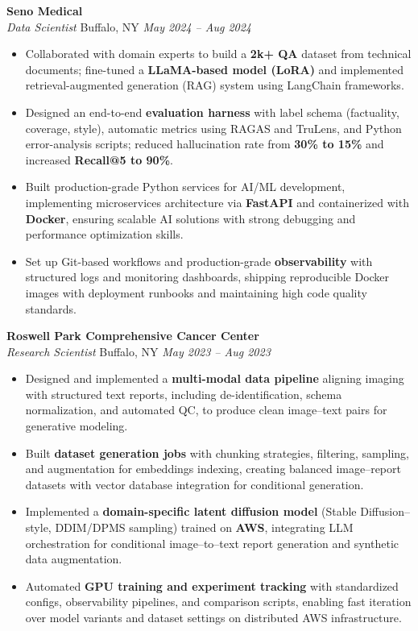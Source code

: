 \vspace*{-1pt}
\item \textbf{Seno Medical}\\
\textit{Data Scientist} \hfill Buffalo, NY \quad \textit{May 2024 -- Aug 2024}
\vspace*{-3pt}
\begin{itemize}[leftmargin=0.2in, topsep=1pt]
  \item Collaborated with domain experts to build a \textbf{2k+ QA} dataset from technical documents; fine-tuned a \textbf{LLaMA-based model (LoRA)} and implemented retrieval-augmented generation (RAG) system using LangChain frameworks.
  \item Designed an end-to-end \textbf{evaluation harness} with label schema (factuality, coverage, style), automatic metrics using RAGAS and TruLens, and Python error-analysis scripts; reduced hallucination rate from \textbf{30\% to 15\%} and increased \textbf{Recall@5 to 90\%}.
  \item Built production-grade Python services for AI/ML development, implementing microservices architecture via \textbf{FastAPI} and containerized with \textbf{Docker}, ensuring scalable AI solutions with strong debugging and performance optimization skills.
  \item Set up Git-based workflows and production-grade \textbf{observability} with structured logs and monitoring dashboards, shipping reproducible Docker images with deployment runbooks and maintaining high code quality standards.
\end{itemize}

\vspace*{-1pt}
\item \textbf{Roswell Park Comprehensive Cancer Center}\\
\textit{Research Scientist} \hfill Buffalo, NY \quad \textit{May 2023 -- Aug 2023}
\vspace*{-3pt}
\begin{itemize}[leftmargin=0.2in, topsep=1pt]
  \item Designed and implemented a \textbf{multi-modal data pipeline} aligning imaging with structured text reports, including de-identification, schema normalization, and automated QC, to produce clean image–text pairs for generative modeling.
  \item Built \textbf{dataset generation jobs} with chunking strategies, filtering, sampling, and augmentation for embeddings indexing, creating balanced image–report datasets with vector database integration for conditional generation.
  \item Implemented a \textbf{domain-specific latent diffusion model} (Stable Diffusion–style, DDIM/DPMS sampling) trained on \textbf{AWS}, integrating LLM orchestration for conditional image–to–text report generation and synthetic data augmentation.
  \item Automated \textbf{GPU training and experiment tracking} with standardized configs, observability pipelines, and comparison scripts, enabling fast iteration over model variants and dataset settings on distributed AWS infrastructure.
\end{itemize}
